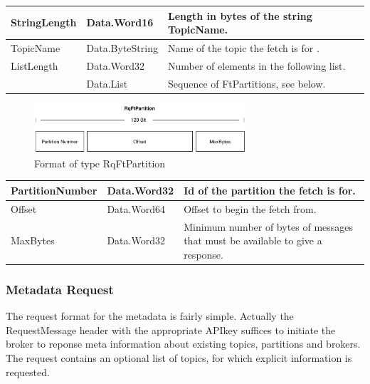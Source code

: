 \begin{table}[H]
\centering
\begin{tabular}{ l  l  p{10cm} }
\hline
StringLength      & Data.Word16     & Length in bytes of the string TopicName.              \\ \hline
TopicName         & Data.ByteString & Name of the topic the fetch is for . \\ \hline
ListLength        & Data.Word32     & Number of elements in the following list.                \\ \hline
[RqFtPartition]     & Data.List       & Sequence of FtPartitions, see below.                \\ \hline
\end{tabular}
\end{table}

\begin{figure}[H]
    \centering
    \includegraphics[width=0.7\textwidth]{images/impl-prot-types-ftPartition.png}
    \caption{Format of type RqFtPartition }
    \label{fig:impl-prot-types-ftPartition}
\end{figure}

\begin{table}[H]
\centering
\begin{tabular}{ l  l  p{10cm} }
\hline
PartitionNumber & Data.Word32 & Id of the partition the fetch is for.                                          \\ \hline
Offset          & Data.Word64 & Offset to begin the fetch from.                                                \\ \hline
MaxBytes        & Data.Word32 & Minimum number of bytes of messages that must be available to give a response. \\ \hline
\end{tabular}
\end{table}

\subsubsection{Metadata Request}
The request format for the metadata is fairly simple. Actually the
RequestMessage header with the appropriate APIkey suffices to initiate the
broker to reponse meta information about existing topics, partitions and
brokers. The request contains an optional list of topics, for which explicit
information is requested.

